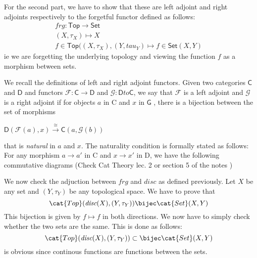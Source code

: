 \begin{frame}
    
For the second part, we have to show that these are left adjoint and right
adjoints respectively to the forgetful functor defined as follows: 
\begin{align*}
    frg : \textsf{Top} \to \textsf{Set} \\
    (X, \tau_X ) \mapsto X \\
    f \in \textsf{Top}((X,\tau_X),(Y,tau_Y ) \mapsto f \in \textsf{Set}(X,Y) 
\end{align*}
ie we are forgetting the underlying topology and viewing the function \(f\) as a
morphism between sets. 
\end{frame}
\begin{frame}
    
We recall the definitions of left and right adjoint functors. Given two
categories \(\textsf{C}\) and \(\textsf{D}\) and functors \(\mathcal{F}:
\textsf{C} \to \textsf{D}\) and \(\mathcal{G}: \textsf{D} to \textsf{C}\), we
say that \(\mathcal{F}\) is a left adjoint and \(\mathcal{G}\) is a right
adjoint if for objects \(a\) in \textsf{C} and \(x\) in \(\textsf{G}\) , there
is a bijection between the set of morphisms 

\(\textsf{D}(\mathcal{F}(a) , x) \xrightarrow{\cong} \textsf{C}(a,
\mathcal{G}(b))\)

that is \textit{natural} in \(a\) and \(x\). The naturality condition is
formally stated as follows: For any morphism \(a \to a'\) in \textsf{C} and \(x
\to x'\) in \textsf{D}, we have the following commutative diagrams (Check Cat
Theory lec. 2 or section 5 of the notes )
\end{frame}
\begin{frame}
    
We now check the adjuction between \(frg\) and \(disc\) as  defined previously.
Let \(X \) be any set and \((Y,\tau_Y)\) be any topological space. We have to
prove that 
\begin{equation}
    \cat{Top}(\textit{disc}(X) , (Y, \tau_Y)  ) \bijec \cat{Set}(X, Y)
\end{equation}
This bijection is given by  \(f \mapsto f \) in both directions. We now have to
simply check whether the two sets are the same. This is done as follows: 
\begin{equation}
    \cat{Top}(\textit{disc}(X) , (Y, \tau_Y)  ) \subset \bijec \cat{Set}(X, Y)
\end{equation}
is obvious since continous functions are functions between the sets. 
\end{frame}
